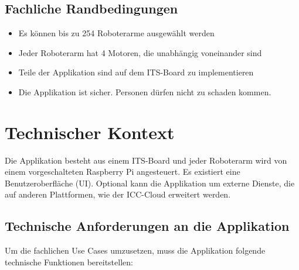\subsection{Fachliche Randbedingungen}

\begin{itemize}
	\item Es können bis zu 254 Roboterarme ausgewählt werden
	\item Jeder Roboterarm hat 4 Motoren, die unabhängig voneinander sind
	\item Teile der Applikation sind auf dem ITS-Board zu implementieren
	\item Die Applikation ist sicher. Personen dürfen nicht zu schaden kommen.
	
\end{itemize}



\section{Technischer Kontext}

Die Applikation besteht aus einem ITS-Board und jeder Roboterarm wird von einem vorgeschalteten Raspberry Pi angesteuert. Es existiert eine Benutzeroberfläche (UI). Optional kann die Applikation um externe Dienste, die auf anderen Plattformen, wie der ICC-Cloud erweitert werden.

\subsection{Technische Anforderungen an die Applikation}

Um die fachlichen Use Cases umzusetzen, muss die Applikation folgende technische Funktionen bereitstellen:

